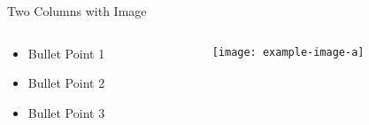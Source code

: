 \begin{frame}{Two Columns with Image}
  \begin{columns}

    \begin{column}{0.5\textwidth}
      \begin{itemize}
            \item Bullet Point 1
            \item Bullet Point 2
            \item Bullet Point 3
      \end{itemize}
    \end{column}

    \begin{column}{0.5\textwidth}
        \texttt{[image: example-image-a]}
    \end{column}

  \end{columns}
\end{frame}
